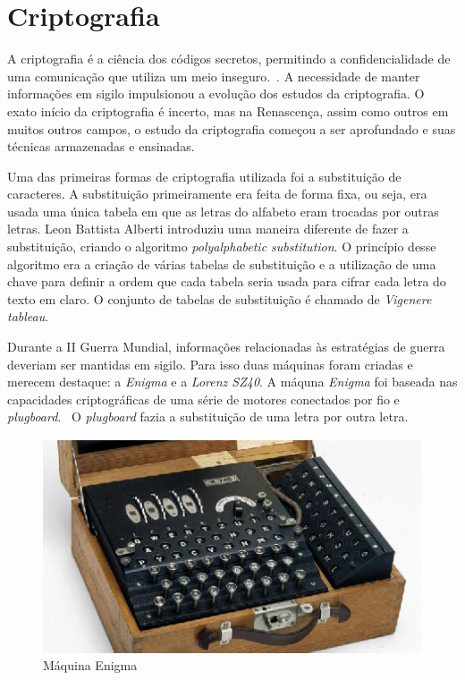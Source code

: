 \chapter{Criptografia}
\label{cryptograhy}

%
A criptografia é a ciência dos códigos secretos, permitindo a confidencialidade de uma comunicação que utiliza um meio inseguro.~\cite{vauldenay}. A necessidade de manter informações em sigilo impulsionou a evolução dos estudos da criptografia. O exato início da criptografia é incerto, mas na Renascença, assim como outros em muitos outros campos, o estudo da criptografia começou a ser aprofundado e suas técnicas armazenadas e ensinadas. \cite{donald-davies}

%
Uma das primeiras formas de criptografia utilizada foi a substituição de caracteres. A substituição primeiramente era feita de forma fixa, ou seja, era usada uma única tabela em que as letras do alfabeto eram trocadas por outras letras. Leon Battista Alberti introduziu uma maneira diferente de fazer a substituição, criando o algoritmo \textit{polyalphabetic substitution}. O princípio desse algoritmo era a criação de várias tabelas de substituição e a utilização de uma chave para definir a ordem que cada tabela seria usada para cifrar cada letra do texto em claro. O conjunto de tabelas de substituição é chamado de \textit{Vigenere tableau}.

%
Durante a II Guerra Mundial, informações relacionadas às estratégias de guerra deveriam ser mantidas em sigilo. Para isso duas máquinas foram criadas e merecem destaque: a \textit{Enigma} e a \textit{Lorenz SZ40}. A máquna \textit{Enigma} foi baseada nas capacidades criptográficas de uma série de motores conectados por fio e \textit{plugboard}.~\cite{jennifer-wilcox} O \textit{plugboard} fazia a substituição de uma letra por outra letra. 
\begin{figure}[h]
\centering
  \includegraphics[keepaspectratio=true,scale=2]
  {figuras/enigma.eps}
  \caption[{Máquina Enigma}]{Máquina Enigma\protect\footnotemark}
  \label{enigma-machine}
\end{figure}

